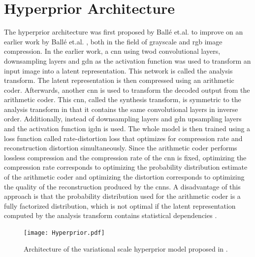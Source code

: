 \section{Hyperprior Architecture\label{sec3:hyperprior}}
The hyperprior architecture was first proposed by Ballé et.al. \citep{balle_variational_2018} to improve on an earlier work by Ballé et.al. \citep{balle_end--end_2017}, both in the field of grayscale and \ac{rgb} image compression. In the earlier work, a \ac{cnn} using \ac{twod} convolutional layers, downsampling layers and \ac{gdn} as the activation function was used to transform an input image into a latent representation. This network is called the analysis transform. The latent representation is then compressed using an arithmetic coder. Afterwards, another \ac{cnn} is used to transform the decoded output from the arithmetic coder. This \ac{cnn}, called the synthesis transform, is symmetric to the analysis transform in that it contains the same convolutional layers in inverse order. Additionally, instead of downsampling layers and \ac{gdn} upsampling layers and the activation function \ac{igdn} is used. The whole model is then trained using a loss function called rate-distortion loss that optimizes for compression rate and reconstruction distortion simultaneously. Since the arithmetic coder performs lossless compression and the compression rate of the \ac{cnn} is fixed, optimizing the compression rate corresponds to optimizing the probability distribution estimate of the arithmetic coder and optimizing the distortion corresponds to optimizing the quality of the reconstruction produced by the \acp{cnn}. A disadvantage of this approach is that the probability distribution used for the arithmetic coder is a fully factorized distribution, which is not optimal if the latent representation computed by the analysis transform contains statistical dependencies \citep{balle_variational_2018}.

\begin{figure}
\centering
\texttt{[image: Hyperprior.pdf]}
\caption[Scale hyperprior architecture]{Architecture of the variational scale hyperprior model proposed in \citep{balle_variational_2018}.}
\label{fig:hyperprior}
\end{figure}

